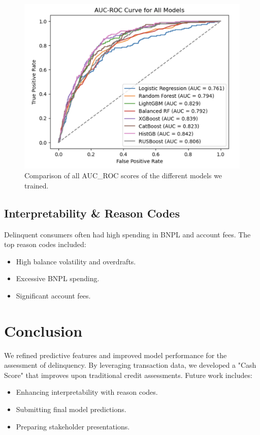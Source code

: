 \documentclass[12pt,letterpaper]{article}
\begin{document}
\begin{figure}[H]
    \centering
    \includegraphics[width=\textwidth]
    {figure/auc_roc_all_models.png}
    \caption{Comparison of all AUC\_ROC scores of the different models we trained.}
    \label{fig:standardized_credit_balance}
\end{figure}

\subsection{Interpretability \& Reason Codes}
Delinquent consumers often had high spending in BNPL and account fees. The top reason codes included:
\begin{itemize}
    \item High balance volatility and overdrafts.
    \item Excessive BNPL spending.
    \item Significant account fees.
\end{itemize}

\section{Conclusion}
We refined predictive features and improved model performance for the assessment of delinquency. By leveraging transaction data, we developed a "Cash Score" that improves upon traditional credit assessments. Future work includes:
\begin{itemize}
    \item Enhancing interpretability with reason codes.
    \item Submitting final model predictions.
    \item Preparing stakeholder presentations.
\end{itemize}
\end{document}
